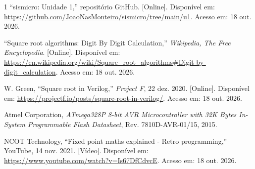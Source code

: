 \documentclass[conference]{IEEEtran}
\begin{document}
\begin{thebibliography}{1}
``sismicro: Unidade 1,'' repositório GitHub. [Online]. Disponível em: \url{https://github.com/JoaoNasMonteiro/sismicro/tree/main/u1}. Acesso em: 18 out. 2026.

``Square root algorithms: Digit By Digit Calculation,'' \emph{Wikipedia, The Free Encyclopedia}. [Online]. Disponível em: \url{https://en.wikipedia.org/wiki/Square_root_algorithms#Digit-by-digit_calculation}. Acesso em: 18 out. 2026.

W. Green, ``Square root in Verilog,'' \emph{Project F}, 22 dez. 2020. [Online]. Disponível em: \url{https://projectf.io/posts/square-root-in-verilog/}. Acesso em: 18 out. 2026.

 Atmel Corporation, \textit{ATmega328P 8-bit AVR Microcontroller with 32K Bytes In-System Programmable Flash Datasheet}, Rev. 7810D-AVR-01/15, 2015.

NCOT Technology, ``Fixed point maths explained - Retro programming,'' YouTube, 14 nov. 2021. [Vídeo]. Disponível em: \url{https://www.youtube.com/watch?v=Is67DfCdvcE}. Acesso em: 18 out. 2026.
\end{thebibliography}
\end{document}
